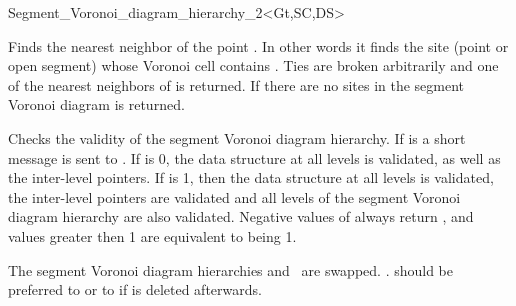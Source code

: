 \begin{ccRefClass}{Segment_Voronoi_diagram_hierarchy_2<Gt,SC,DS>}


%
{Finds the nearest neighbor of the point . In other words it
finds the site (point or open segment) whose Voronoi cell contains
. Ties are broken arbitrarily and one of the nearest neighbors
of  is returned. If there are no sites in the
segment Voronoi diagram  is returned.}
\ccGlue
{}



%
{Checks the validity of the segment Voronoi diagram hierarchy. If
 is  a short message is sent to
. If  is 0, the data structure at all levels 
is validated, as well as the inter-level pointers. If  is
1, then the data structure at all levels is validated, the inter-level
pointers are validated and all levels of the segment Voronoi diagram
hierarchy are also validated. Negative values of  always
return , and values greater then 1 are equivalent to
 being 1.}

%
\ccGlue
{The segment Voronoi diagram hierarchies  and \ccVar\ are
swapped. \ccVar. should be preferred to \ccVar{} or to \ccVar{} if  is deleted afterwards.}



\end{ccRefClass}
